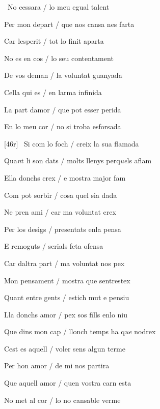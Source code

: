 \documentclass[12pt]{article}
\begin{document}
\begin{estrofa}

 \textparagraph\  No cessara / lo meu egual talent

 Per mon depart / que nos cansa nes farta

 Car lesperit / tot lo finit aparta

 No es en cos / lo seu contentament

 De vos deman / la voluntat guanyada

 Cella qui es / en larma infinida

 La part damor / que pot esser perida

 En lo meu cor / no si troba esforsada

\end{estrofa}



\begin{estrofa}

 [46r] \textparagraph\  Si com lo foch / creix la sua flamada

 Qua\textit{n}t li son dats / molts llenys perq\textit{ue}ls aflam

 Ella donchs crex / e mostra major fam

 Com pot sorbir / cosa quel sia dada

 Ne pren ami / car ma voluntat crex

 Per los desigs / presentats enla pensa

 E remoguts / serials feta ofensa

 Car daltra part / ma voluntat nos pex

\end{estrofa}



\begin{estrofa}

 Mon pensament / mostra que sentrestex

 Quant entre gents / estich mut e pensiu

 Lla donchs amor / pex sos fills enlo niu

 Que dins mon cap / llonch temps ha q\textit{ue} nodrex

 Cest es aquell / voler sens algun terme

 Per hon amor / de mi nos partira

 Que aquell amor / quen vostra carn esta

 No met al cor / lo no cansable verme

\end{estrofa}
\end{document}
